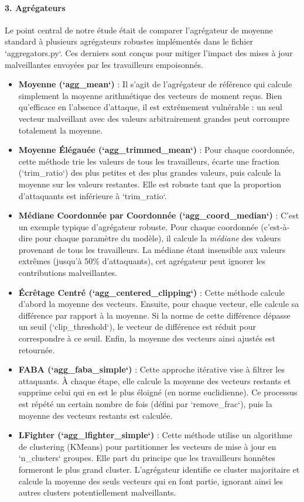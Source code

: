 \documentclass{article}
\begin{document}
\paragraph{3. Agrégateurs}
Le point central de notre étude était de comparer l'agrégateur de moyenne standard à plusieurs agrégateurs robustes implémentés dans le fichier `aggregators.py`. Ces derniers sont conçus pour mitiger l'impact des mises à jour malveillantes envoyées par les travailleurs empoisonnés.
\begin{itemize}
    \item \textbf{Moyenne (`agg_mean`)} : Il s'agit de l'agrégateur de référence qui calcule simplement la moyenne arithmétique des vecteurs de moment reçus. Bien qu'efficace en l'absence d'attaque, il est extrêmement vulnérable : un seul vecteur malveillant avec des valeurs arbitrairement grandes peut corrompre totalement la moyenne.
    
    \item \textbf{Moyenne Élégauée (`agg_trimmed_mean`)} : Pour chaque coordonnée, cette méthode trie les valeurs de tous les travailleurs, écarte une fraction (`trim_ratio`) des plus petites et des plus grandes valeurs, puis calcule la moyenne sur les valeurs restantes. Elle est robuste tant que la proportion d'attaquants est inférieure à `trim_ratio`.
    
    \item \textbf{Médiane Coordonnée par Coordonnée (`agg_coord_median`)} : C'est un exemple typique d'agrégateur robuste. Pour chaque coordonnée (c'est-à-dire pour chaque paramètre du modèle), il calcule la \textit{médiane} des valeurs provenant de tous les travailleurs. La médiane étant insensible aux valeurs extrêmes (jusqu'à 50\% d'attaquants), cet agrégateur peut ignorer les contributions malveillantes.
    
    \item \textbf{Écrêtage Centré (`agg_centered_clipping`)} : Cette méthode calcule d'abord la moyenne des vecteurs. Ensuite, pour chaque vecteur, elle calcule sa différence par rapport à la moyenne. Si la norme de cette différence dépasse un seuil (`clip_threshold`), le vecteur de différence est réduit pour correspondre à ce seuil. Enfin, la moyenne des vecteurs ainsi ajustés est retournée.
    
    \item \textbf{FABA (`agg_faba_simple`)} : Cette approche itérative vise à filtrer les attaquants. À chaque étape, elle calcule la moyenne des vecteurs restants et supprime celui qui en est le plus éloigné (en norme euclidienne). Ce processus est répété un certain nombre de fois (défini par `remove_frac`), puis la moyenne des vecteurs restants est calculée.
    
    \item \textbf{LFighter (`agg_lfighter_simple`)} : Cette méthode utilise un algorithme de clustering (KMeans) pour partitionner les vecteurs de mise à jour en `n_clusters` groupes. Elle part du principe que les travailleurs honnêtes formeront le plus grand cluster. L'agrégateur identifie ce cluster majoritaire et calcule la moyenne des seuls vecteurs qui en font partie, ignorant ainsi les autres clusters potentiellement malveillants.
\end{itemize}
\end{document}
